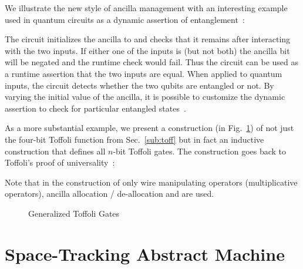 \documentclass[sigplan,10pt,review,anonymous]{acmart}
\begin{document}
\PIFDinterp{}

\begin{figure}
  
\end{figure}
We illustrate the new style of ancilla management with an interesting
example used in quantum circuits as a dynamic assertion of
entanglement~\cite{DBLP:journals/cal/ZhouB19}:

\PIFDparity{}

\noindent The circuit initializes the ancilla to  and
checks that it remains  after interacting with the two
inputs. If either one of the inputs is  (but not both)
the ancilla bit will be negated and the runtime check would fail. Thus
the circuit can be used as a runtime assertion that the two inputs are
equal. When applied to quantum inputs, the circuit detects whether the
two qubits are entangled or not. By varying the initial value of the
ancilla, it is possible to customize the dynamic assertion to check
for particular entangled states~\cite{DBLP:journals/cal/ZhouB19}.

As a more substantial example, we present a construction (in
Fig.~\ref{fig:toff}) of not just the four-bit Toffoli function from
Sec.~\ref{sub:toff} but in fact an inductive construction that defines
all $n$-bit Toffoli gates. The construction goes back to Toffoli's
proof of universality~\cite{Toffoli:1980}:\\

{\centering }

Note that in the construction of  only wire manipulating operators
(multiplicative operators), ancilla allocation / de-allocation and 
are used.

\begin{figure}[ht]
  \PIFDtoffoli{}
\caption{\label{fig:toff}Generalized Toffoli Gates}
\end{figure}

\section{Space-Tracking Abstract Machine}
\label{sec:space}
\end{document}
